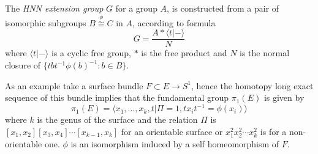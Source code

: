 \documentclass[12pt]{article}
\begin{document}
The \emph{HNN extension group} $G$ for a group $A$, is constructed from a pair of isomorphic subgroups $B\stackrel{\phi}\cong C$ in $A$, according to formula 
$$G=\frac{A*\langle t|- \rangle}{N}$$
where 
$\langle t|- \rangle$ is a cyclic free group, $*$ is the free product and $N$ is the normal closure of $\{tbt^{-1}\phi(b)^{-1}\colon b\in B\}$. 

As an example take a surface bundle $F\subset E\to S^1$, hence the homotopy long exact sequence of this bundle implies that the fundamental group $\pi_1(E)$ is given by
$$\pi_1(E)=\langle x_1,...,x_k,t|\Pi=1,tx_it^{-1}=\phi(x_i)\rangle$$
where $k$ is the genus of the surface and the relation $\Pi$ is $[x_1,x_2][x_3,x_4]\cdots[x_{k-1},x_k]$ for an orientable surface or $x_1^2x_2^2\cdots x_k^2$ is for a non-orientable one. $\phi$ is an isomorphism induced by a self homeomorphism of $F$. 
\end{document}
